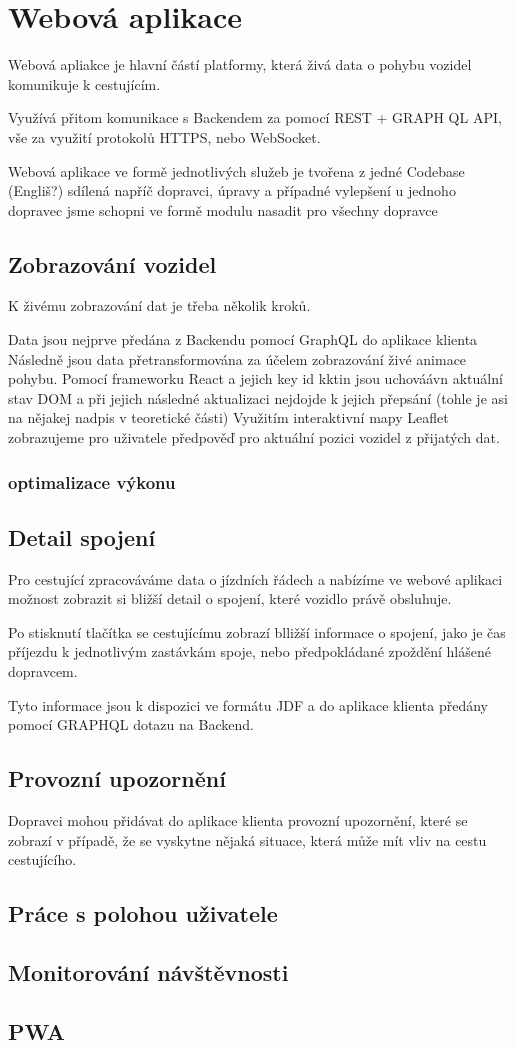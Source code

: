 \section{Webová aplikace}

Webová apliakce je hlavní částí platformy, která živá data o pohybu vozidel komunikuje k cestujícím.

Využívá přitom komunikace s Backendem za pomocí REST + GRAPH QL API, vše za využití protokolů HTTPS, nebo WebSocket.



Webová aplikace ve formě jednotlivých služeb je tvořena z jedné Codebase (Engliš?) sdílená napříč dopravci, úpravy a případné vylepšení u jednoho dopravec jsme schopni ve formě modulu nasadit pro všechny dopravce


\subsection{Zobrazování vozidel}
K živému zobrazování dat je třeba několik kroků.

Data jsou nejprve předána z Backendu pomocí GraphQL do aplikace klienta
Následně jsou data přetransformována za účelem zobrazování živé animace pohybu.
Pomocí frameworku React a jejich key id kktin jsou uchováávn aktuální stav DOM a při jejich následné aktualizaci nejdojde k jejich přepsání (tohle je asi na nějakej nadpis v teoretické části)
Využitím interaktivní mapy Leaflet zobrazujeme pro uživatele předpověď pro aktuální pozici vozidel z přijatých dat.

\subsubsection{optimalizace výkonu}

\subsection{Detail spojení}
Pro cestující zpracováváme data o jízdních řádech a nabízíme ve webové aplikaci možnost zobrazit si bližší detail o spojení, které vozidlo právě obsluhuje.

Po stisknutí tlačítka se cestujícímu zobrazí blližší informace o spojení, jako je čas příjezdu k jednotlivým zastávkám spoje, nebo předpokládané zpoždění hlášené dopravcem.

Tyto informace jsou k dispozici ve formátu JDF a do aplikace klienta předány pomocí GRAPHQL dotazu na Backend.

\subsection{Provozní upozornění}
Dopravci mohou přidávat do aplikace klienta provozní upozornění, které se zobrazí v případě, že se vyskytne nějaká situace, která může mít vliv na cestu cestujícího.
\subsection{Práce s polohou uživatele}
\subsection{Monitorování návštěvnosti}
\subsection{PWA}